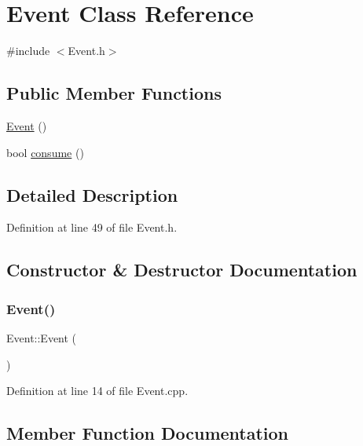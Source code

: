 \hypertarget{class_event}{}\section{Event Class Reference}
\label{class_event}


{\ttfamily \#include $<$Event.\+h$>$}

\subsection*{Public Member Functions}
\begin{DoxyCompactItemize}
\item 
\hyperlink{class_event_a5a40dd4708297f7031e29b39e039ae10}{Event} ()
\item 
bool \hyperlink{class_event_a93521bedffd2a0b9c979e15241e060ba}{consume} ()
\end{DoxyCompactItemize}


\subsection{Detailed Description}


Definition at line 49 of file Event.\+h.



\subsection{Constructor \& Destructor Documentation}
\mbox{\label{class_event_a5a40dd4708297f7031e29b39e039ae10}} 
\subsubsection{\texorpdfstring{Event()}{Event()}}
{\footnotesize\ttfamily Event\+::\+Event (\begin{DoxyParamCaption}{ }\end{DoxyParamCaption})}



Definition at line 14 of file Event.\+cpp.



\subsection{Member Function Documentation}
\mbox{\label{class_event_a93521bedffd2a0b9c979e15241e060ba}} 
